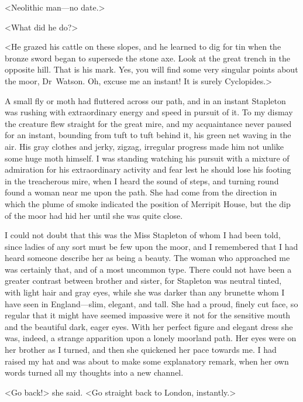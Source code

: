 \begin{withoutfootnotes}
<Neolithic man—no date.>

<What did he do?>

<He grazed his cattle on these slopes, and he learned to dig for tin when the bronze sword began to supersede the stone axe. Look at the great trench in the opposite hill. That is his mark. Yes, you will find some very singular points about the moor, Dr~Watson. Oh, excuse me an instant! It is surely Cyclopides.>
\end{withoutfootnotes}


A small fly or moth had fluttered across our path, and in an instant Stapleton was rushing with extraordinary energy and speed in pursuit of it. To my dismay the creature flew straight for the great mire, and my acquaintance never paused for an instant, bounding from tuft to tuft behind it, his green net waving in the air. His gray clothes and jerky, zigzag, irregular progress made him not unlike some huge moth himself. I was standing watching his pursuit with a mixture of admiration for his extraordinary activity and fear lest he should lose his footing in the treacherous mire, when I heard the sound of steps, and turning round found a woman near me upon the path. She had come from the direction in which the plume of smoke indicated the position of Merripit House, but the dip of the moor had hid her until she was quite close.

I could not doubt that this was the Miss Stapleton of whom I had been told, since ladies of any sort must be few upon the moor, and I remembered that I had heard someone describe her as being a beauty. The woman who approached me was certainly that, and of a most uncommon type. There could not have been a greater contrast between brother and sister, for Stapleton was neutral tinted, with light hair and gray eyes, while she was darker than any brunette whom I have seen in England—slim, elegant, and tall. She had a proud, finely cut face, so regular that it might have seemed impassive were it not for the sensitive mouth and the beautiful dark, eager eyes. With her perfect figure and elegant dress she was, indeed, a strange apparition upon a lonely moorland path. Her eyes were on her brother as I turned, and then she quickened her pace towards me. I had raised my hat and was about to make some explanatory remark, when her own words turned all my thoughts into a new channel.

<Go back!> she said. <Go straight back to London, instantly.>

